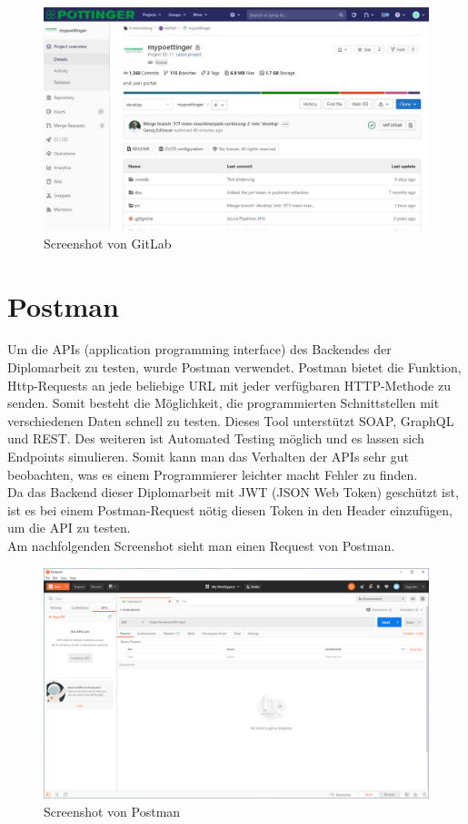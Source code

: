 \begin{figure}[H]
	\centerline{
		\includegraphics[width=1\textwidth, frame]{./grafiken/gitlab_startseite.JPG}
	}
	\vskip0pt
	\caption{Screenshot von GitLab}
\end{figure}
\section{Postman}
Um die APIs (application programming interface) des Backendes der Diplomarbeit zu testen, wurde Postman verwendet. Postman bietet die Funktion, Http-Requests an jede beliebige URL mit jeder verfügbaren HTTP-Methode zu senden. Somit besteht die Möglichkeit, die programmierten Schnittstellen mit verschiedenen Daten schnell zu testen. Dieses Tool unterstützt SOAP, GraphQL und REST. Des weiteren ist Automated Testing möglich und es lassen sich Endpoints simulieren. Somit kann man das Verhalten der APIs sehr gut beobachten, was es einem Programmierer leichter macht Fehler zu finden. \autocite{postmanDocs} \\
Da das Backend dieser Diplomarbeit mit JWT (JSON Web Token) geschützt ist, ist es bei einem Postman-Request nötig diesen Token in den Header einzufügen, um die API zu testen.  \\
Am nachfolgenden Screenshot sieht man einen Request von Postman.
\begin{figure}[H]
	\centerline{
		\includegraphics[width=1\textwidth, frame]{./grafiken/postman.png}
	}
	\vskip0pt
	\caption{Screenshot von Postman} \label{fig:postman}
\end{figure}


